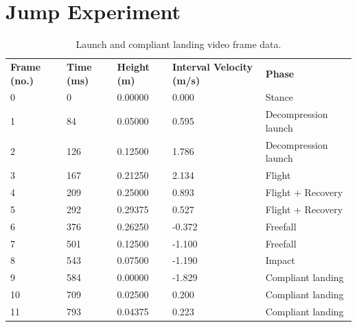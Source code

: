 \chapter{Jump Experiment}
\label{app:Jump Experiment}

\begin{table}[!ht]
\centering
\begin{tabular}{l|llll}
\textbf{Frame (no.)} & \textbf{Time (ms)} & \textbf{Height (m)} & \textbf{Interval Velocity (m/s)} & \textbf{Phase}\\
0	&	0	&	0.00000	&	0.000	&	Stance	\\
1	&	84	&	0.05000	&	0.595	&	Decompression launch	\\
2	&	126	&	0.12500	&	1.786	&	Decompression launch	\\
3	&	167	&	0.21250	&	2.134	&	Flight	\\	
4	&	209	&	0.25000	&	0.893	&	Flight + Recovery	\\
5	&	292	&	0.29375	&	0.527	&	Flight + Recovery	\\
6	&	376	&	0.26250	&	-0.372	&	Freefall	\\
7	&	501	&	0.12500	&	-1.100	&	Freefall	\\
8	&	543	&	0.07500	&	-1.190	&	Impact	\\
9	&	584	&	0.00000	&	-1.829	&	Compliant landing	\\
10	&	709	&	0.02500	&	0.200	&	Compliant landing	\\
11	&	793	&	0.04375	&	0.223	&	Compliant landing
\end{tabular}
\caption{Launch and compliant landing video frame data.}
\label{tab:jump-test-data}
\end{table}

